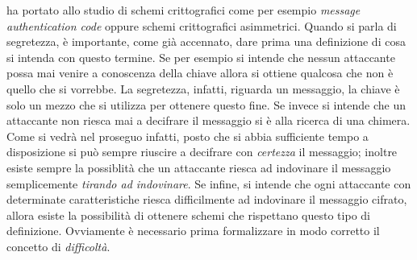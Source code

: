\documentclass[a4paper,openright,twoside,12pt]{report}
\begin{document}
ha portato allo studio di schemi crittografici come per esempio \emph{message authentication code} oppure schemi crittografici asimmetrici.
Quando si parla di segretezza, \`e importante, come gi\`a accennato, dare prima una definizione di cosa si intenda con questo termine.
Se per esempio si intende che nessun attaccante possa mai venire a conoscenza della chiave allora si ottiene qualcosa che non \`e quello che si vorrebbe. La segretezza, infatti, riguarda un messaggio, 
la chiave \`e solo un mezzo che si utilizza per ottenere questo fine. 
Se invece si intende che un attaccante non riesca mai a decifrare il messaggio si \`e alla ricerca di una chimera. Come si vedr\`a nel proseguo infatti, posto che si abbia sufficiente tempo 
a disposizione si pu\`o sempre riuscire a decifrare con \emph{certezza} il messaggio; inoltre esiste sempre la possiblit\`a che un attaccante riesca ad indovinare il messaggio
semplicemente \emph{tirando ad indovinare}. Se infine, si intende che ogni attaccante con determinate caratteristiche riesca difficilmente ad indovinare il messaggio cifrato, allora esiste la 
possibilit\`a di ottenere schemi che rispettano questo tipo di definizione. Ovviamente \`e necessario prima formalizzare in modo 
corretto il concetto di \emph{difficolt\`a}.
\end{document}
